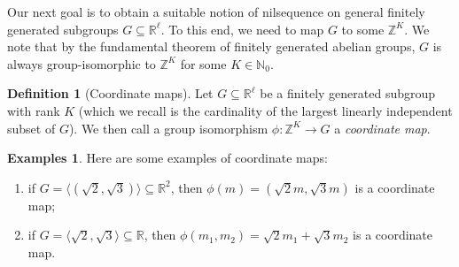 \documentclass[11pt]{amsart}
\theoremstyle{definition}
\newtheorem{definition}[lemma]{Definition}
\newtheorem{examples}[lemma]{Examples}
\newcommand{\N}{{\mathbb N}}
\newcommand{\R}{{\mathbb R}}
\newcommand{\Z}{{\mathbb Z}}
\newcommand{\1}{{\mathbf{1}}}
\begin{document}
 


Our next goal is to obtain a suitable notion of nilsequence on general finitely generated subgroups $G\subseteq\R^\ell$. To this end, we need to map $G$ to some $\Z^K$. We note that by the fundamental theorem of finitely generated abelian groups, $G$ is always group-isomorphic to $\Z^K$ for some $K\in\N_0$.
\begin{definition}[Coordinate maps]\label{D: coordinate maps}
    Let $G\subseteq\R^\ell$ be a finitely generated subgroup with rank $K$ (which we recall is the cardinality of the largest linearly independent subset of $G$). We then call a group isomorphism $\phi:\Z^K\to G$ a \textit{coordinate map}.
\end{definition}

\begin{examples}

Here are some examples of coordinate maps:
\begin{enumerate}
    \item if $G = \langle (\sqrt{2}, \sqrt{3}) \rangle\subseteq\R^2$, then $\phi(m) = (\sqrt{2} m, \sqrt{3} m)$ is a coordinate map;
    \item if $G = \langle \sqrt{2}, \sqrt{3} \rangle\subseteq\R$, then $\phi(m_1,m_2) = \sqrt{2} m_1 + \sqrt{3} m_2$ is a  coordinate map. 
\end{enumerate}    
\end{examples}

\end{document}
